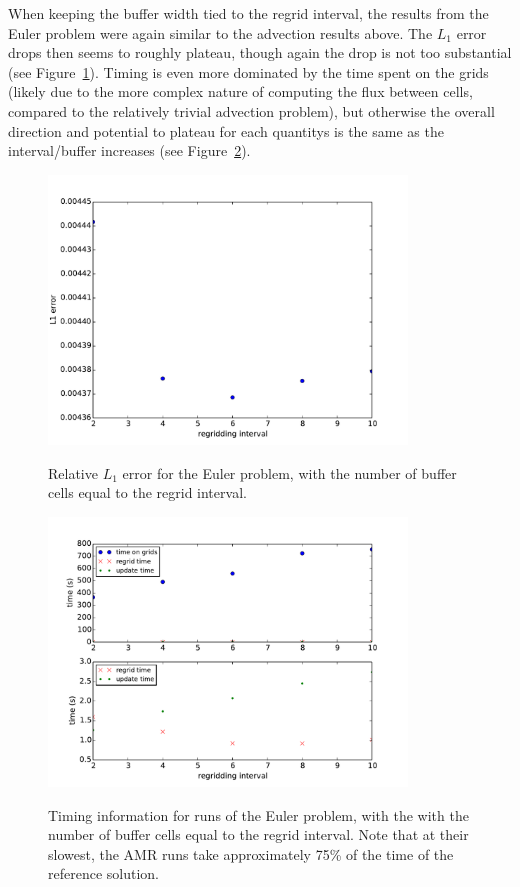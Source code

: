 \documentclass[11pt]{article}
\begin{document}
When keeping the buffer width tied to the regrid interval, the results
from the Euler problem were again similar to the advection results above.
The $L_1$ error drops then seems to roughly plateau, though again the
drop is not too substantial (see Figure~\ref{fig:err_euler}). Timing is
even more dominated by the time spent on the grids (likely due to the more
complex nature of computing the flux between cells, compared to the relatively
trivial advection problem), but otherwise the overall direction and 
potential to plateau for each
quantitys is the same as the interval/buffer increases (see 
Figure~\ref{fig:time_euler}).

\begin{figure}[!htb]
\centering
\caption{Relative $L_1$ error for the Euler problem, with the number of
buffer cells equal to the regrid interval.}
\includegraphics[width=0.85\textwidth]{myclaw/l1_err_euler}
\label{fig:err_euler}
\end{figure}

\begin{figure}[!htb]
\centering
\caption{Timing information for runs of the Euler problem, with the
with the number of buffer cells equal to the regrid interval. Note that
at their slowest, the AMR runs take approximately 75\% of the time of the
reference solution.}
\includegraphics[width=0.85\textwidth]{myclaw/time_euler}
\label{fig:time_euler}
\end{figure}
\end{document}
